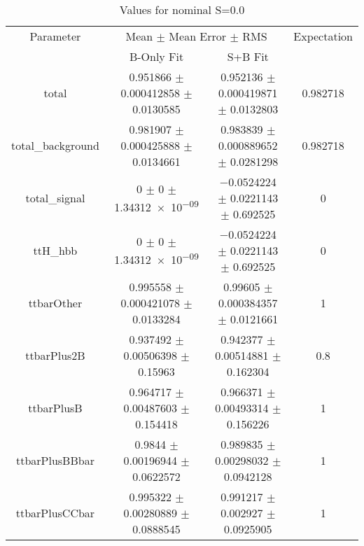 \begin{table}
\centering
\caption{Values for nominal S=0.0}
\begin{tabular}{cccc}
\toprule
Parameter & \multicolumn{2}{c}{Mean $\pm$ Mean Error $\pm$ RMS} & Expectation\\
 & B-Only Fit & S+B Fit & \\
\midrule
total & \num{0.951866} $\pm$ \num{0.000412858} $\pm$ \num{0.0130585} & \num{0.952136} $\pm$ \num{0.000419871} $\pm$ \num{0.0132803} & \num{0.982718}\\
total\_background & \num{0.981907} $\pm$ \num{0.000425888} $\pm$ \num{0.0134661} & \num{0.983839} $\pm$ \num{0.000889652} $\pm$ \num{0.0281298} & \num{0.982718}\\
total\_signal & \num{0} $\pm$ \num{0} $\pm$ \num{1.34312e-09} & \num{-0.0524224} $\pm$ \num{0.0221143} $\pm$ \num{0.692525} & \num{0}\\
ttH\_hbb & \num{0} $\pm$ \num{0} $\pm$ \num{1.34312e-09} & \num{-0.0524224} $\pm$ \num{0.0221143} $\pm$ \num{0.692525} & \num{0}\\
ttbarOther & \num{0.995558} $\pm$ \num{0.000421078} $\pm$ \num{0.0133284} & \num{0.99605} $\pm$ \num{0.000384357} $\pm$ \num{0.0121661} & \num{1}\\
ttbarPlus2B & \num{0.937492} $\pm$ \num{0.00506398} $\pm$ \num{0.15963} & \num{0.942377} $\pm$ \num{0.00514881} $\pm$ \num{0.162304} & \num{0.8}\\
ttbarPlusB & \num{0.964717} $\pm$ \num{0.00487603} $\pm$ \num{0.154418} & \num{0.966371} $\pm$ \num{0.00493314} $\pm$ \num{0.156226} & \num{1}\\
ttbarPlusBBbar & \num{0.9844} $\pm$ \num{0.00196944} $\pm$ \num{0.0622572} & \num{0.989835} $\pm$ \num{0.00298032} $\pm$ \num{0.0942128} & \num{1}\\
ttbarPlusCCbar & \num{0.995322} $\pm$ \num{0.00280889} $\pm$ \num{0.0888545} & \num{0.991217} $\pm$ \num{0.002927} $\pm$ \num{0.0925905} & \num{1}\\
\bottomrule
\end{tabular}
\end{table}